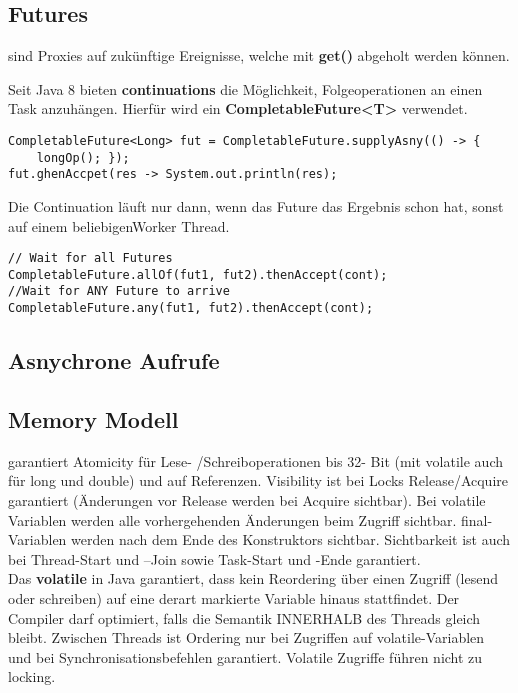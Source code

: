 \subsection{Futures} sind Proxies auf zukünftige Ereignisse, welche mit \textbf{get()} abgeholt werden können.

Seit Java 8 bieten \textbf{continuations} die Möglichkeit, Folgeoperationen an einen Task anzuhängen. Hierfür wird ein \textbf{CompletableFuture<T>} verwendet.

\begin{lstlisting}[style=Java]
CompletableFuture<Long> fut = CompletableFuture.supplyAsny(() -> {
	longOp(); });
fut.ghenAccpet(res -> System.out.println(res);
\end{lstlisting}

Die Continuation läuft nur dann, wenn das Future das Ergebnis schon hat, sonst auf einem beliebigenWorker Thread.

\begin{lstlisting}[style=Java]
// Wait for all Futures
CompletableFuture.allOf(fut1, fut2).thenAccept(cont);
//Wait for ANY Future to arrive
CompletableFuture.any(fut1, fut2).thenAccept(cont);
\end{lstlisting}

\subsection{Asnychrone Aufrufe}

\subsection{Memory Modell}
 garantiert Atomicity für Lese- /Schreiboperationen bis 32- Bit (mit volatile auch für long und double) und auf Referenzen. Visibility ist bei Locks Release/Acquire garantiert (Änderungen vor Release werden bei Acquire sichtbar). Bei volatile Variablen werden alle vorhergehenden Änderungen beim Zugriff sichtbar. final- Variablen werden nach dem Ende des Konstruktors sichtbar. Sichtbarkeit ist auch bei Thread-Start und –Join sowie Task-Start und -Ende garantiert.
\\
 
 Das \textbf{volatile} in Java garantiert, dass kein Reordering über einen Zugriff (lesend oder schreiben) auf eine derart markierte Variable hinaus stattfindet. Der Compiler darf optimiert, falls die Semantik INNERHALB des Threads gleich bleibt. Zwischen Threads ist Ordering nur bei Zugriffen auf volatile-Variablen und bei Synchronisationsbefehlen garantiert. Volatile Zugriffe führen nicht zu locking.

